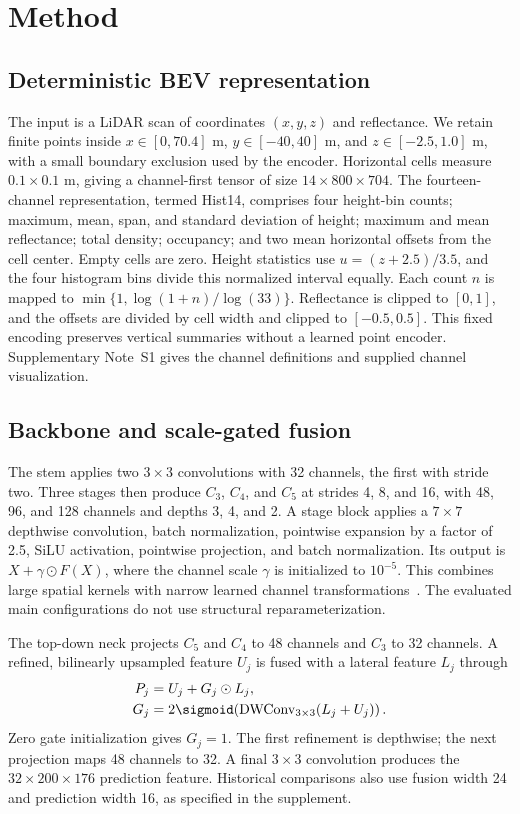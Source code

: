 \section{Method}
\label{sec:method}
\subsection{Deterministic BEV representation}
\label{sec:encoding}
The input is a LiDAR scan of coordinates $(x,y,z)$ and reflectance. We retain finite points inside $x\in[0,70.4]$ m, $y\in[-40,40]$ m, and $z\in[-2.5,1.0]$ m, with a small boundary exclusion used by the encoder. Horizontal cells measure $0.1\times0.1$ m, giving a channel-first tensor of size $14\times800\times704$. The fourteen-channel representation, termed Hist14, comprises four height-bin counts; maximum, mean, span, and standard deviation of height; maximum and mean reflectance; total density; occupancy; and two mean horizontal offsets from the cell center. Empty cells are zero. Height statistics use $u=(z+2.5)/3.5$, and the four histogram bins divide this normalized interval equally. Each count $n$ is mapped to $\min\{1,\log(1+n)/\log(33)\}$. Reflectance is clipped to $[0,1]$, and the offsets are divided by cell width and clipped to $[-0.5,0.5]$. This fixed encoding preserves vertical summaries without a learned point encoder. Supplementary Note~S1 gives the channel definitions and supplied channel visualization.

\subsection{Backbone and scale-gated fusion}
The stem applies two $3\times3$ convolutions with 32 channels, the first with stride two. Three stages then produce $C_3$, $C_4$, and $C_5$ at strides 4, 8, and 16, with 48, 96, and 128 channels and depths 3, 4, and 2. A stage block applies a $7\times7$ depthwise convolution, batch normalization, pointwise expansion by a factor of 2.5, SiLU activation, pointwise projection, and batch normalization. Its output is $X+\gamma\odot F(X)$, where the channel scale $\gamma$ is initialized to $10^{-5}$. This combines large spatial kernels with narrow learned channel transformations~\cite{liu2022convnext}. The evaluated main configurations do not use structural reparameterization.

The top-down neck projects $C_5$ and $C_4$ to 48 channels and $C_3$ to 32 channels. A refined, bilinearly upsampled feature $U_j$ is fused with a lateral feature $L_j$ through
\begin{equation}
 \begin{aligned}
 P_j&=U_j+G_j\odot L_j,\\
 G_j&=2\sigmoid\!\left(\operatorname{DWConv}_{3\times3}(L_j+U_j)\right).
 \end{aligned}
\end{equation}
Zero gate initialization gives $G_j=1$. The first refinement is depthwise; the next projection maps 48 channels to 32. A final $3\times3$ convolution produces the $32\times200\times176$ prediction feature. Historical comparisons also use fusion width 24 and prediction width 16, as specified in the supplement.

